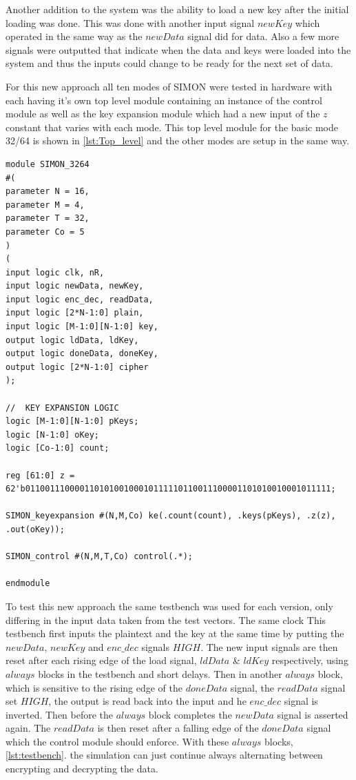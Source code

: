 \documentclass[12pt,twoside,a4paper]{report}
\begin{document}
	Another addition to the system was the ability to load a new key after the initial loading was done. This was done with another input signal $newKey$ which operated in the same way as the $newData$ signal did for data. Also a few more signals were outputted that indicate when the data and keys were loaded into the system and thus the inputs could change to be ready for the next set of data.
	
	For this new approach all ten modes of SIMON were tested in hardware with each having it's own top level module containing an instance of the control module as well as the key expansion module which had a new input of the $z$ constant that varies with each mode. This top level module for the basic mode 32/64 is shown in \autoref{lst:Top_level} and the other modes are setup in the same way.

	\begin{minipage}{\linewidth}
	\begin{lstlisting}[label={lst:Top_level},caption={The next state logic for the ($PRE$) control module},style=SVStyle]
module SIMON_3264
#(
parameter N = 16,
parameter M = 4,
parameter T = 32,		
parameter Co = 5
)
(
input logic clk, nR,
input logic newData, newKey,
input logic enc_dec, readData,
input logic [2*N-1:0] plain,
input logic [M-1:0][N-1:0] key,
output logic ldData, ldKey,
output logic doneData, doneKey,
output logic [2*N-1:0] cipher
);

//	KEY EXPANSION LOGIC
logic [M-1:0][N-1:0] pKeys;
logic [N-1:0] oKey;
logic [Co-1:0] count;

reg [61:0] z = 62'b01100111000011010100100010111110110011100001101010010001011111;

SIMON_keyexpansion #(N,M,Co) ke(.count(count), .keys(pKeys), .z(z), .out(oKey));

SIMON_control #(N,M,T,Co) control(.*);

endmodule
	\end{lstlisting}
	\end{minipage}

	
	To test this new approach the same testbench was used for each version, only differing in the input data taken from the test vectors. The same clock This testbench first inputs the plaintext and the key at the same time by putting the $newData$, $newKey$ and $enc\_dec$ signals $HIGH$. The new input signals are then reset after each rising edge of the load signal, $ldData$ \& $ldKey$ respectively, using $always$ blocks in the testbench and short delays. Then in another $always$ block, which is sensitive to the rising edge of the $doneData$ signal, the $readData$ signal set $HIGH$, the output is read back into the input and he $enc\_dec$ signal is inverted. Then before the $always$ block completes the $newData$ signal is asserted again. The $readData$ is then reset after a falling edge of the $doneData$ signal which the control module should enforce. With these $always$ blocks, \autoref{lst:testbench}. the simulation can just continue always alternating between encrypting and decrypting the data.
\end{document}
